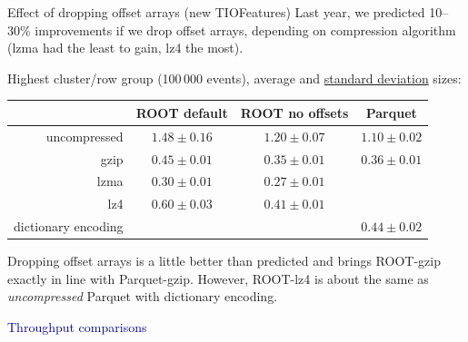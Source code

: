 \documentclass[aspectratio=169]{beamer}
\begin{document}
\begin{frame}{Effect of dropping offset arrays (new TIOFeatures)}
\vspace{0.35 cm}
Last year, we predicted 10--30\% improvements if we drop offset arrays, depending on compression algorithm (lzma had the least to gain, lz4 the most).

\vspace{0.25 cm}
Highest cluster/row group (100\,000 events), average and \underline{standard deviation} sizes:

\renewcommand{\arraystretch}{1.2}

\begin{center}
\begin{tabular}{r c c c}
                    & ROOT default    & ROOT no offsets & Parquet         \\\hline
uncompressed        & $1.48 \pm 0.16$ & $1.20 \pm 0.07$ & $1.10 \pm 0.02$ \\
gzip                & $0.45 \pm 0.01$ & $0.35 \pm 0.01$ & $0.36 \pm 0.01$ \\
lzma                & $0.30 \pm 0.01$ & $0.27 \pm 0.01$ &                 \\
lz4                 & $0.60 \pm 0.03$ & $0.41 \pm 0.01$ &                 \\
dictionary encoding &                 &                 & $0.44 \pm 0.02$ \\
\end{tabular}
\end{center}

\vspace{0.25 cm}
Dropping offset arrays is a little better than predicted and brings ROOT-gzip exactly in line with Parquet-gzip. However, ROOT-lz4 is about the same as {\it uncompressed} Parquet with dictionary encoding.
\end{frame}

\begin{frame}{}
\vspace{0.5 cm}
\begin{center}
\Huge \textcolor{darkblue}{Throughput comparisons}
\end{center}
\end{frame}
\end{document}
